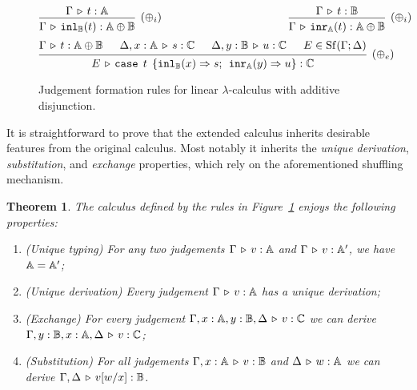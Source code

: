\documentclass[submission,copyright,creativecommons]{eptcs}
\newtheorem{theorem}{Theorem}[section]
\begin{document}
\begin{figure}[h]
    \begin{equation*}
    \begin{prooftree}
        \hypo{\Gamma \vljud t: \typeA}
        \infer1[\rulename{$\oplus_i$}]{\Gamma \vljud \dintrol{t}: \typeA \oplus \typeB}
    \end{prooftree}
    \hspace{4cm}
    \begin{prooftree}
        \hypo{\Gamma \vljud t: \typeB}
        \infer1[\rulename{$\oplus_i$}]{\Gamma \vljud \dintror{t}: \typeA \oplus \typeB}
    \end{prooftree} 
    \end{equation*}
    \vspace{0.25cm}
    \begin{equation*}
    \begin{prooftree}
        \hypo{\Gamma \vljud t: \typeA \oplus \typeB}
        \hypo{\Delta, x: \typeA \vljud s: \typeC}
        \hypo{\Delta, y: \typeB \vljud u: \typeC}
        \hypo{E \in \Shuff(\Gamma; \Delta)}
        \infer4[\rulename{$\oplus_e$}]{E \vljud \celim{t}{s}{u} : \typeC}
    \end{prooftree}
    \end{equation*}
    \caption{Judgement formation rules for linear $\lambda$-calculus with additive
    disjunction.}
    \label{fig:typing_rules_cond}
\end{figure}
It is straightforward to prove that the extended calculus inherits desirable
features from the original calculus. Most notably it inherits the \emph{unique
derivation}, \emph{substitution}, and \emph{exchange} properties, which rely on
the aforementioned shuffling mechanism. 

\begin{theorem}\label{thm:properties}
        The calculus defined by the rules in Figure~\ref{fig:typing_rules_cond}
        enjoys the following properties:
	\begin{enumerate}
                \item (Unique typing) For any two judgements $\Gamma \, \triangleright \, v :
                        \mathbb{A}$ and $\Gamma \, \triangleright \, v : \mathbb{A}'$, we have
                        $\mathbb{A} = \mathbb{A}'$; \label{i:unique_type}
                \item (Unique derivation) Every judgement $\Gamma \, \triangleright \, v :
                        \mathbb{A}$ has a unique derivation; \label{i:unique_der}
                \item (Exchange) For every judgement $\Gamma, x : \mathbb{A}, y :
                        \mathbb{B}, \Delta \, \triangleright \, v : \mathbb{C}$ \label{i:exch} we can
                        derive $\Gamma, y : \mathbb{B}, x : \mathbb{A}, \Delta \, \triangleright \, v
                        : \mathbb{C}$; 
                \item (Substitution) For all judgements $\Gamma, x : \mathbb{A}
                        \, \triangleright \, v : \mathbb{B}$ and $\Delta \, \triangleright \, w : \mathbb{A}$ we
                        can derive $\Gamma,\Delta \, \triangleright \, v[w/x] : \mathbb{B}$.
                        \label{i:subst} 
	\end{enumerate}
\end{theorem}
\end{document}
